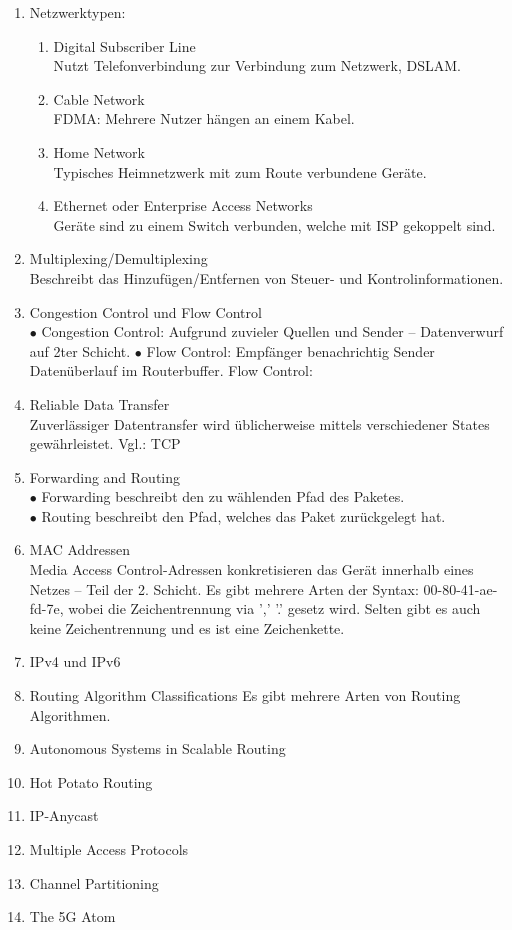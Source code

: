 \documentclass{article}
\begin{document}
\begin{enumerate}[$\bullet$]
        \item Netzwerktypen:
        \begin{enumerate}
            \item Digital Subscriber Line\\
            Nutzt Telefonverbindung zur Verbindung zum Netzwerk, DSLAM.  
            \item Cable Network\\
            FDMA: Mehrere Nutzer hängen an einem Kabel.
            \item Home Network\\
            Typisches Heimnetzwerk mit zum Route verbundene Geräte.
            \item Ethernet oder Enterprise Access Networks\\
            Geräte sind zu einem Switch verbunden, welche mit ISP gekoppelt sind. 
        \end{enumerate}
        \item Multiplexing/Demultiplexing\\
        Beschreibt das Hinzufügen/Entfernen von Steuer- und Kontrolinformationen.
        \item Congestion Control und Flow Control\\
        $\bullet$ Congestion Control: Aufgrund zuvieler Quellen und Sender -- Datenverwurf auf 2ter Schicht.
        $\bullet$ Flow Control: Empfänger benachrichtig Sender Datenüberlauf im Routerbuffer.
        Flow Control:
        \item Reliable Data Transfer\\
        Zuverlässiger Datentransfer wird üblicherweise mittels verschiedener States gewährleistet. Vgl.: TCP
        \item Forwarding and Routing\\
        $\bullet$ Forwarding beschreibt den zu wählenden Pfad des Paketes.\\
        $\bullet$ Routing beschreibt den Pfad, welches das Paket zurückgelegt hat.\\
        \item MAC Addressen \\
        Media Access Control-Adressen konkretisieren das Gerät innerhalb eines Netzes -- Teil der 2. Schicht.
        Es gibt mehrere Arten der Syntax: 00-80-41-ae-fd-7e, wobei die Zeichentrennung via ',' '.' gesetz wird. Selten gibt es auch keine Zeichentrennung und es ist eine Zeichenkette.
        \item IPv4 und IPv6
        \item Routing Algorithm Classifications
        Es gibt mehrere Arten von Routing Algorithmen.
        \item Autonomous Systems in Scalable Routing
        \item Hot Potato Routing
        \item IP-Anycast
        \item Multiple Access Protocols
        \item Channel Partitioning
        \item The 5G Atom
    \end{enumerate}
\end{document}
